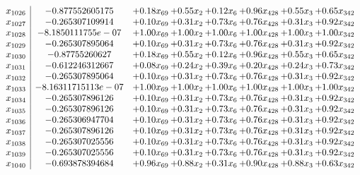 \documentclass[8pt]{article}
\begin{document}
\[\begin{array}{c| c c@{\hskip 2pt} c@{\hskip 2pt} c@{\hskip 2pt} c@{\hskip 2pt} c@{\hskip 2pt} c@{\hskip 2pt} }
 x_{1026}   &  -0.877552605175 & +  0.18 x_{69} & +  0.55 x_{2} & +  0.12 x_{6} & +  0.96 x_{428} & +  0.55 x_{3} & +  0.65 x_{342}\\
 x_{1027}   &  -0.265307109914 & +  0.10 x_{69} & +  0.31 x_{2} & +  0.73 x_{6} & +  0.76 x_{428} & +  0.31 x_{3} & +  0.92 x_{342}\\
 x_{1028}   &  -8.1850111755e-07 & +  1.00 x_{69} & +  1.00 x_{2} & +  1.00 x_{6} & +  1.00 x_{428} & +  1.00 x_{3} & +  1.00 x_{342}\\
 x_{1029}   &  -0.265307895064 & +  0.10 x_{69} & +  0.31 x_{2} & +  0.73 x_{6} & +  0.76 x_{428} & +  0.31 x_{3} & +  0.92 x_{342}\\
 x_{1030}   &  -0.87755260627 & +  0.18 x_{69} & +  0.55 x_{2} & +  0.12 x_{6} & +  0.96 x_{428} & +  0.55 x_{3} & +  0.65 x_{342}\\
 x_{1031}   &  -0.612246312667 & +  0.08 x_{69} & +  0.24 x_{2} & +  0.39 x_{6} & +  0.20 x_{428} & +  0.24 x_{3} & +  0.73 x_{342}\\
 x_{1032}   &  -0.265307895064 & +  0.10 x_{69} & +  0.31 x_{2} & +  0.73 x_{6} & +  0.76 x_{428} & +  0.31 x_{3} & +  0.92 x_{342}\\
 x_{1033}   &  -8.16311715113e-07 & +  1.00 x_{69} & +  1.00 x_{2} & +  1.00 x_{6} & +  1.00 x_{428} & +  1.00 x_{3} & +  1.00 x_{342}\\
 x_{1034}   &  -0.265307896126 & +  0.10 x_{69} & +  0.31 x_{2} & +  0.73 x_{6} & +  0.76 x_{428} & +  0.31 x_{3} & +  0.92 x_{342}\\
 x_{1035}   &  -0.265307896126 & +  0.10 x_{69} & +  0.31 x_{2} & +  0.73 x_{6} & +  0.76 x_{428} & +  0.31 x_{3} & +  0.92 x_{342}\\
 x_{1036}   &  -0.265306947704 & +  0.10 x_{69} & +  0.31 x_{2} & +  0.73 x_{6} & +  0.76 x_{428} & +  0.31 x_{3} & +  0.92 x_{342}\\
 x_{1037}   &  -0.265307896126 & +  0.10 x_{69} & +  0.31 x_{2} & +  0.73 x_{6} & +  0.76 x_{428} & +  0.31 x_{3} & +  0.92 x_{342}\\
 x_{1038}   &  -0.265307025556 & +  0.10 x_{69} & +  0.31 x_{2} & +  0.73 x_{6} & +  0.76 x_{428} & +  0.31 x_{3} & +  0.92 x_{342}\\
 x_{1039}   &  -0.265307025556 & +  0.10 x_{69} & +  0.31 x_{2} & +  0.73 x_{6} & +  0.76 x_{428} & +  0.31 x_{3} & +  0.92 x_{342}\\
 x_{1040}   &  -0.693878394684 & +  0.96 x_{69} & +  0.88 x_{2} & +  0.31 x_{6} & +  0.90 x_{428} & +  0.88 x_{3} & +  0.63 x_{342}\\

\end{array}\]
\end{document}
